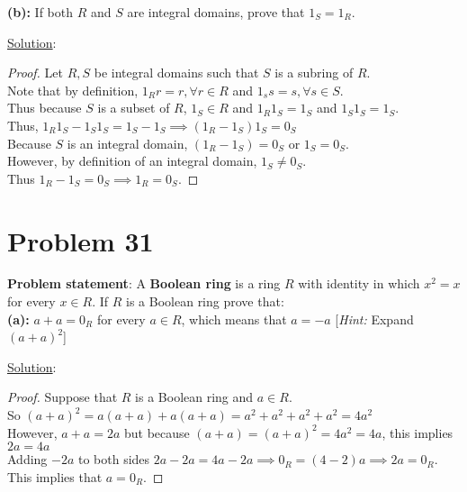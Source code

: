\documentclass{article} %
\begin{document}
\textbf{(b):} If both $R$ and $S$ are integral domains, prove that $1_S = 1_R$.
\\
\begin{addmargin}[1em]{0em}
\underline{Solution}:
\begin{proof}
Let $R, S$ be integral domains such that $S$ is a subring of $R$.
\\Note that by definition, $1_Rr = r, \forall r \in R$ and $1_ss = s, \forall s \in S$.
\\Thus because $S$ is a subset of $R$, $1_S \in R$ and $1_R1_S = 1_S$ and $1_S1_S = 1_S$.
\\Thus, $1_R1_S - 1_S1_S = 1_S - 1_S \implies (1_R - 1_S)1_S = 0_S$
\\Because $S$ is an integral domain, $(1_R - 1_S) = 0_S$ or $1_S = 0_S$.
\\However, by definition of an integral domain, $1_S \neq 0_S$.
\\Thus $1_R - 1_S = 0_S \implies 1_R = 0_S$.
\end{proof}
\end{addmargin}

\newpage

\section*{Problem 31}


\textbf{Problem statement}: A \textbf{Boolean ring} is a ring $R$ with identity in which $x^2 = x$ for every $x \in R$.  If $R$ is a Boolean ring prove that:
\\

\textbf{(a):} $a + a = 0_R$ for every $a \in R$, which means that $a = -a$ [\textit{Hint:} Expand $(a + a)^2$]
\\
\begin{addmargin}[1em]{0em}
\underline{Solution}:
\begin{proof}
Suppose that $R$ is a Boolean ring and $a \in R$.
\\So $(a+a)^2 = a(a + a) + a(a + a) = a^2 + a^2 + a^2 + a^2 = 4a^2$
\\However, $a + a = 2a$ but because $(a+a) = (a+a)^2 = 4a^2 = 4a$, this implies $2a = 4a$
\\Adding $-2a$ to both sides $2a - 2a = 4a - 2a \implies 0_R = (4-2)a \implies 2a = 0_R$.
\\This implies that $a = 0_R$.
\end{proof}
\end{addmargin}    
\end{document}
